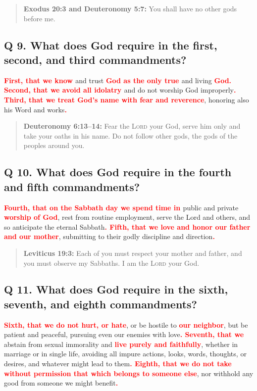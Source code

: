 \documentclass[]{memoir}
\newcommand\Children[1]{\textbf{\textcolor{red}{#1}}}
\newcommand\Quote[2]{\begin{quote}{\textbf{#1:}{ #2}}\end{quote}}
\begin{document}
\Quote{Exodus 20:3 and Deuteronomy 5:7\index[deu]{05:7@5:7}}{You shall have no other gods before me.}

\subsection{Q 9. What does God require in the first, second, and third commandments?}
\Children{First, that we know }and trust \Children{God as the only true }and living \Children{God. Second, that we avoid all idolatry }and do not worship God improperly\Children{. Third, that we treat God's name with fear and reverence}, honoring also his Word and works\Children{.}

\Quote{Deuteronomy 6:13--14}{Fear the \textsc{Lord} your God, serve him only and take your oaths in his name. Do not follow other gods, the gods of the peoples around you.}

\subsection{Q 10. What does God require in the fourth and fifth commandments?}
\Children{Fourth, that on the Sabbath day we spend time in }public and private \Children{worship of God}, rest from routine employment, serve the Lord and others, and so anticipate the eternal Sabbath\Children{. Fifth, that we love and honor our father and our mother}, submitting to their godly discipline and direction\Children{.}

\Quote{Leviticus 19:3}{Each of you must respect your mother and father, and you must observe my Sabbaths. I am the \textsc{Lord} your God.}

\subsection{Q 11. What does God require in the sixth, seventh, and eighth commandments?}
\Children{Sixth, that we do not hurt, or hate}, or be hostile to \Children{ our neighbor}, but be patient and peaceful, pursuing even our enemies with love\Children{. Seventh, that we }abstain from sexual immorality and \Children{live purely and faithfully}, whether in marriage or in single life, avoiding all impure actions, looks, words, thoughts, or desires, and whatever might lead to them\Children{. Eighth, that we do not take without permission that which belongs to someone else}, nor withhold any good from someone we might benefit\Children{.}
\end{document}
